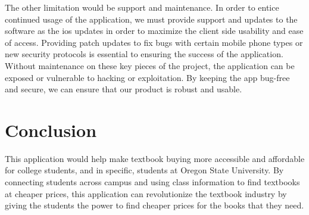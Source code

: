 \documentclass[12pt]{article}
\begin{document}
The other limitation would be support and maintenance. In order to entice continued usage of the application, we must provide support and updates to the software as the ios updates in order to maximize the client side usability and ease of access. Providing patch updates to fix bugs with certain mobile phone types or new security protocols is essential to ensuring the success of the application. Without maintenance on these key pieces of the project, the application can be exposed or vulnerable to hacking or exploitation. By keeping the app bug-free and secure, we can ensure that our product is robust and usable.


\section{Conclusion}
This application would help make textbook buying more accessible and affordable for college students, and in specific, students at Oregon State University. By connecting students across campus and using class information to find textbooks at cheaper prices, this application can revolutionize the textbook industry by giving the students the power to find cheaper prices for the books that they need.

\cite{bookhuff}
\cite{booknbc}



\end{document}
